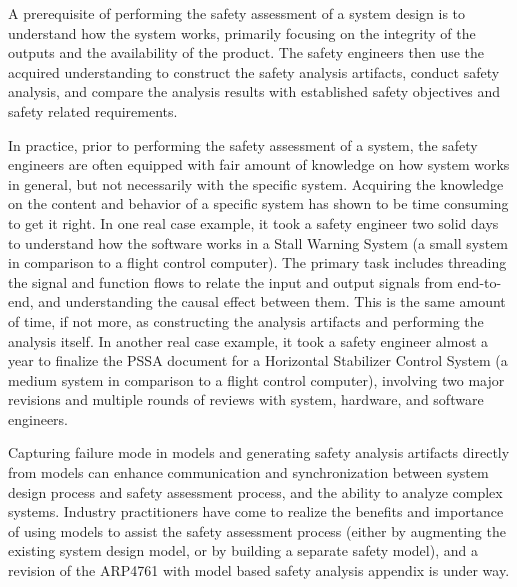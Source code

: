 A prerequisite of performing the safety assessment of a system design is to understand how the system works, primarily focusing on the integrity of the outputs and the availability of the product. The safety engineers then use the acquired understanding to construct the safety analysis artifacts, conduct safety analysis, and compare the analysis results with established safety objectives and safety related requirements. 

In practice, prior to performing the safety assessment of a system, the safety engineers are often equipped with fair amount of knowledge on how system works in general, but not necessarily with the specific system. Acquiring the knowledge on the content and behavior of a specific system has shown to be time consuming to get it right. In one real case example, it took a safety engineer two solid days to understand how the software works in a Stall Warning System (a small system in comparison to a flight control computer). The primary task includes threading the signal and function flows to relate the input and output signals from end-to-end, and understanding the causal effect between them. This is the same amount of time, if not more, as constructing the analysis artifacts and performing the analysis itself. In another real case example, it took a safety engineer almost a year to finalize the PSSA document for a Horizontal Stabilizer Control System (a medium system in comparison to a flight control computer), involving two major revisions and multiple rounds of reviews with system, hardware, and software engineers.

Capturing failure mode in models and generating safety analysis artifacts directly from models can enhance communication and synchronization between system design process and safety assessment process, and the ability to analyze complex systems. Industry practitioners have come to realize the benefits and importance of
using models to assist the safety assessment process (either by augmenting the existing system design model, or by building a separate safety model), and a revision of the ARP4761 with model based safety analysis appendix is under way.

